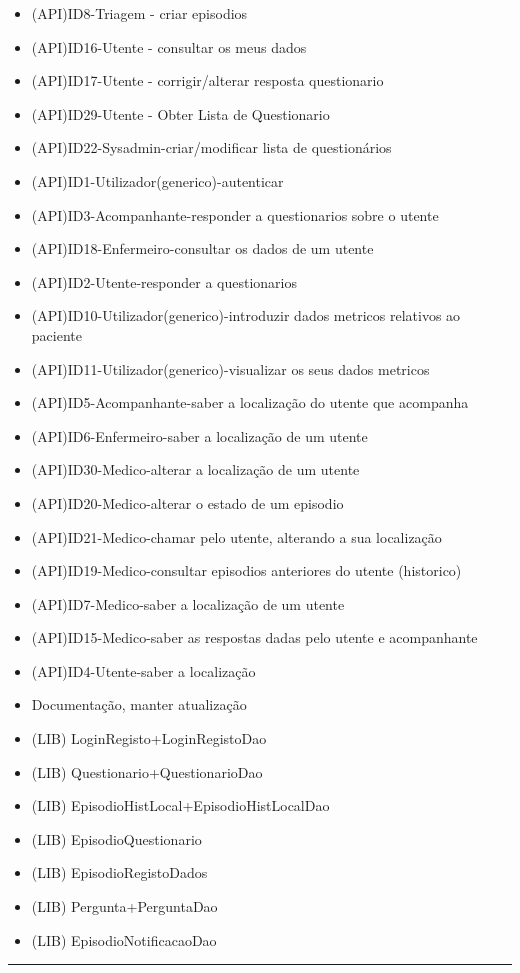 \begin{itemize}
	\item (API)ID8-Triagem - criar episodios
	\item (API)ID16-Utente - consultar os meus dados
	\item (API)ID17-Utente - corrigir/alterar resposta questionario
	\item (API)ID29-Utente - Obter Lista de Questionario
	\item (API)ID22-Sysadmin-criar/modificar lista de questionários
	\item (API)ID1-Utilizador(generico)-autenticar
	\item (API)ID3-Acompanhante-responder a questionarios sobre o utente
	\item (API)ID18-Enfermeiro-consultar os dados de um utente
	\item (API)ID2-Utente-responder a questionarios 
	\item (API)ID10-Utilizador(generico)-introduzir dados metricos relativos ao paciente
	\item (API)ID11-Utilizador(generico)-visualizar os seus dados metricos
	\item (API)ID5-Acompanhante-saber a localização do utente que acompanha
	\item (API)ID6-Enfermeiro-saber a localização de um utente
	\item (API)ID30-Medico-alterar a localização de um utente
	\item (API)ID20-Medico-alterar o estado de um episodio
	\item (API)ID21-Medico-chamar pelo utente, alterando a sua localização
	\item (API)ID19-Medico-consultar episodios anteriores do utente (historico)
	\item (API)ID7-Medico-saber a localização de um utente
	\item (API)ID15-Medico-saber as respostas dadas pelo utente e acompanhante
	\item (API)ID4-Utente-saber a localização
	\item Documentação, manter atualização
	\item (LIB) LoginRegisto+LoginRegistoDao
	\item (LIB) Questionario+QuestionarioDao
	\item (LIB) EpisodioHistLocal+EpisodioHistLocalDao
	\item (LIB) EpisodioQuestionario
	\item (LIB) EpisodioRegistoDados
	\item (LIB) Pergunta+PerguntaDao
	\item (LIB) EpisodioNotificacaoDao
\end{itemize}

\noindent \rule{\linewidth}{0.4pt}
\newline
